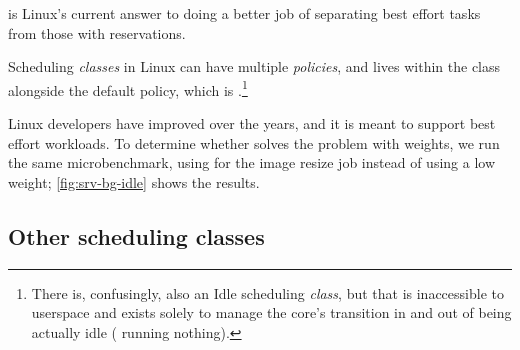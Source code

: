 \schedidle{} is Linux's current answer to doing a better job of separating best
effort tasks from those with reservations.

Scheduling \textit{classes} in Linux can have multiple \textit{policies}, and
\schedidle{} lives within the \normalclass{} class alongside the default policy,
which is \schednormal{}.\footnote{There is, confusingly, also an Idle scheduling
\textit{class}, but that is inaccessible to userspace and exists solely to
manage the core's transition in and out of being actually idle (\ie{} running
nothing).} 

Linux developers have improved \schedidle{} over the years, and it is meant to
support best effort workloads. To determine whether \schedidle{} solves the
problem with \cgroups{} weights, we run the same microbenchmark, using
\schedidle{} for the image resize job instead of using a low \cgroups{} weight;
\autoref{fig:srv-bg-idle} shows the results.


\subsection{Other scheduling classes}


